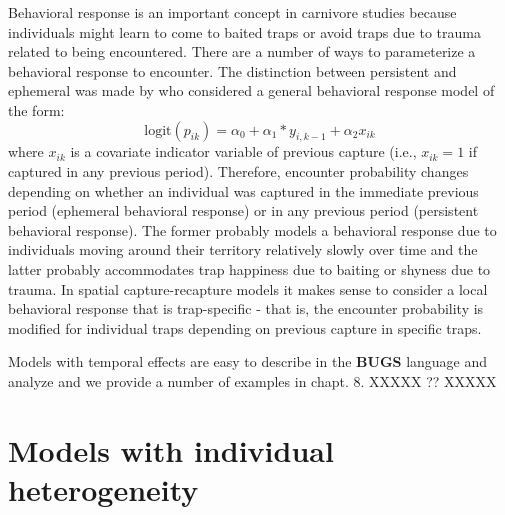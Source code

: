 Behavioral response is an important concept in carnivore studies
because individuals might learn to come to baited traps or avoid traps
due to trauma related to being encountered.  There are a number of
ways to parameterize a behavioral response to encounter. The
distinction between persistent and ephemeral was made by
\citet{yang_chao:2005} who considered a general behavioral response
model of the form:
\[
\mbox{logit}(p_{ik}) = \alpha_{0} + \alpha_{1}*y_{i,k-1} + \alpha_{2} x_{ik}
\]
where $x_{ik}$ is a covariate indicator variable of previous capture
(i.e., $x_{ik} = 1$ if captured in any previous period). Therefore,
encounter probability changes depending on whether an individual was
captured in the immediate previous period (ephemeral behavioral
response) or in any previous period (persistent behavioral
response). The former probably models a behavioral response due to
individuals moving around their territory relatively slowly over time
and the latter probably accommodates trap happiness due to baiting or
shyness due to trauma.  In spatial capture-recapture models it makes
sense to consider a local behavioral response that is trap-specific
\citep{royle_etal:2011} - that is, the encounter probability is
modified for individual traps depending on previous capture in
specific traps.

Models with temporal effects are easy to describe in the {\bf BUGS} language 
and analyze and we provide a number of examples in chapt. 8. XXXXX ?? XXXXX


\section{ Models with individual heterogeneity}
\label{closed.sec.modelmh}



